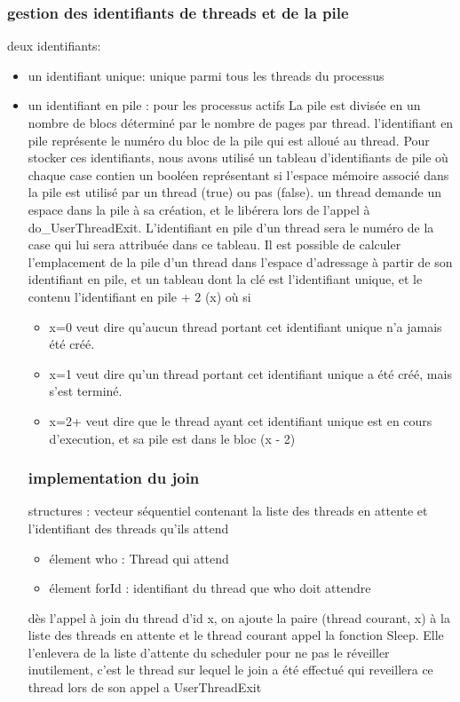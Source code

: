 \documentclass{report}
\begin{document}
		\subsubsection{gestion des identifiants de threads et de la pile}
			deux identifiants:
			\begin{itemize}
				\item un identifiant unique: unique parmi tous les threads du processus
				\item un identifiant en pile : pour les processus actifs
				La pile est divisée en un nombre de blocs déterminé par le nombre de pages par thread. l'identifiant en pile représente le numéro du bloc de la pile qui est alloué au thread. Pour stocker ces identifiants, nous avons utilisé un tableau d'identifiants de pile où chaque case contien un booléen représentant si l'espace mémoire associé dans la pile est utilisé par un thread (true) ou pas (false). un thread demande un espace dans la pile à sa création, et le libérera lors de l'appel à do_UserThreadExit. L'identifiant en pile d'un thread sera le numéro de la case qui lui sera attribuée dans ce tableau. Il est possible de calculer l'emplacement de la pile d'un thread dans l'espace d'adressage à partir de son identifiant en pile, et un tableau dont la clé est l'identifiant unique, et le contenu l'identifiant en pile + 2 (x) où si
				\begin{itemize}
					\item x=0 veut dire qu'aucun thread portant cet identifiant unique n'a jamais été créé.
					\item x=1 veut dire qu'un thread portant cet identifiant unique a été créé, mais s'est terminé.
					\item x=2+ veut dire que le thread ayant cet identifiant unique est en cours d'execution, et sa pile est dans le bloc (x - 2)
				\end{itemize}
		\subsubsection{implementation du join}
			structures : vecteur séquentiel contenant la liste des threads en attente et l'identifiant des threads qu'ils attend
				\begin{itemize}
					\item élement who : Thread qui attend
					\item élement forId : identifiant du thread que who doit attendre
				\end{itemize}
			dès l'appel à join du thread d'id x, on ajoute la paire (thread courant, x) à la liste des threads en attente et le thread courant appel la fonction Sleep. Elle l'enlevera de la liste d'attente du scheduler pour ne pas le réveiller inutilement, c'est le thread sur lequel le join a été effectué qui reveillera ce thread lors de son appel a UserThreadExit


\end{itemize}
\end{document}
